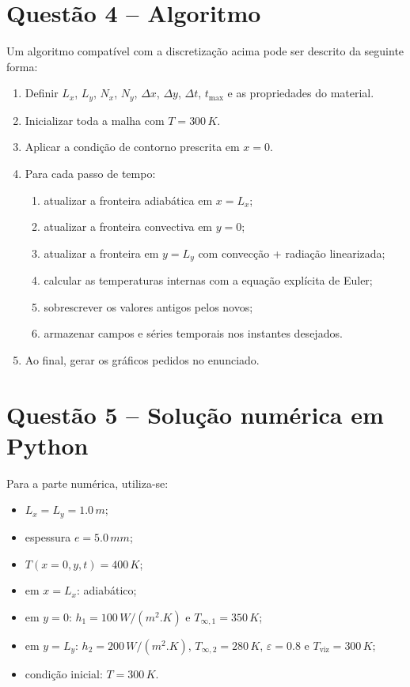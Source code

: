 \documentclass[12pt,a4paper]{article}
\begin{document}
\section{Questão 4 -- Algoritmo}
Um algoritmo compatível com a discretização acima pode ser descrito da seguinte forma:

\begin{enumerate}[leftmargin=1.2cm]
    \item Definir $L_x$, $L_y$, $N_x$, $N_y$, $\Delta x$, $\Delta y$, $\Delta t$, $t_{\max}$ e as propriedades do material.
    \item Inicializar toda a malha com $T=300\,\si{K}$.
    \item Aplicar a condição de contorno prescrita em $x=0$.
    \item Para cada passo de tempo:
    \begin{enumerate}[label=\alph*)]
        \item atualizar a fronteira adiabática em $x=L_x$;
        \item atualizar a fronteira convectiva em $y=0$;
        \item atualizar a fronteira em $y=L_y$ com convecção + radiação linearizada;
        \item calcular as temperaturas internas com a equação explícita de Euler;
        \item sobrescrever os valores antigos pelos novos;
        \item armazenar campos e séries temporais nos instantes desejados.
    \end{enumerate}
    \item Ao final, gerar os gráficos pedidos no enunciado.
\end{enumerate}

\section{Questão 5 -- Solução numérica em Python}
Para a parte numérica, utiliza-se:
\begin{itemize}[leftmargin=1.2cm]
    \item $L_x=L_y=1.0\,\si{m}$;
    \item espessura $e=5.0\,\si{mm}$;
    \item $T(x=0,y,t)=400\,\si{K}$;
    \item em $x=L_x$: adiabático;
    \item em $y=0$: $h_1=100\,\si{W/(m^2.K)}$ e $T_{\infty,1}=350\,\si{K}$;
    \item em $y=L_y$: $h_2=200\,\si{W/(m^2.K)}$, $T_{\infty,2}=280\,\si{K}$, $\varepsilon=0.8$ e $T_{\text{viz}}=300\,\si{K}$;
    \item condição inicial: $T=300\,\si{K}$.
\end{itemize}
\end{document}
